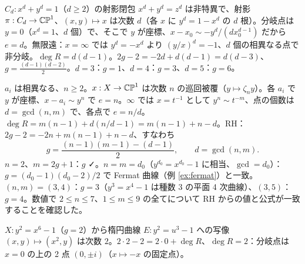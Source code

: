 \begin{center}
\end{center}
\begin{ex}[Fermat 曲線]\label{ex:fermat}
$C_d:x^d+y^d=1$（$d\ge2$）の射影閉包 $x^d+y^d=z^d$ は非特異で、射影 $\pi:C_d\to\mathbb{CP}^1$、$(x,y)\mapsto x$ は次数 $d$（各 $x$ に $y^d=1-x^d$ の $d$ 根）。分岐点は $y=0$（$x^d=1$、$d$ 個）で、そこで $y$ が座標、$x-x_0\sim-y^d/(dx_0^{d-1})$ だから $e=d$。無限遠：$x=\infty$ では $y^d=-x^d$ より $(y/x)^d=-1$、$d$ 個の相異なる点で非分岐。$\deg R=d(d-1)$。$2g-2=-2d+d(d-1)=d(d-3)$、$g=\frac{(d-1)(d-2)}2$。$d=3$：$g=1$、$d=4$：$g=3$、$d=5$：$g=6$。
\end{ex}
\begin{ex}[超楕円曲線の一般化：$y^n=\prod_{i=1}^m(x-a_i)$]\label{ex:superell}
$a_i$ は相異なる、$n\ge2$。$x:X\to\mathbb{CP}^1$ は次数 $n$ の巡回被覆（$y\mapsto\zeta_ny$）。各 $a_i$ で $y$ が座標、$x-a_i\sim y^n$ で $e=n$。$\infty$ では $x=t^{-1}$ として $y^n\sim t^{-m}$、点の個数は $d=\gcd(n,m)$ で、各点で $e=n/d$。$\deg R=m(n-1)+d(n/d-1)=m(n-1)+n-d$。RH：$2g-2=-2n+m(n-1)+n-d$、すなわち
\[
g=\frac{(n-1)(m-1)-(d-1)}2,\qquad d=\gcd(n,m).
\]
$n=2$、$m=2g+1$：$g$ ✓。$n=m=d_0$（$y^{d_0}=x^{d_0}-1$ に相当、$\gcd=d_0$）：$g=(d_0-1)(d_0-2)/2$ で Fermat 曲線（例 \ref{ex:fermat}）と一致。$(n,m)=(3,4)$：$g=3$（$y^3=x^4-1$ は種数 3 の平面 4 次曲線）、$(3,5)$：$g=4$。数値で $2\le n\le7$、$1\le m\le9$ の全てについて RH からの値と公式が一致することを確認した。
\end{ex}
\begin{ex}[被覆 $y^2=x^6-1\to y^2=u^3-1$]\label{ex:quot}
$X:y^2=x^6-1$（$g=2$）から楕円曲線 $E:y^2=u^3-1$ への写像 $(x,y)\mapsto(x^2,y)$ は次数 $2$。$2\cdot2-2=2\cdot0+\deg R$、$\deg R=2$：分岐点は $x=0$ の上の 2 点 $(0,\pm i)$（$x\mapsto-x$ の固定点）。
\end{ex}

